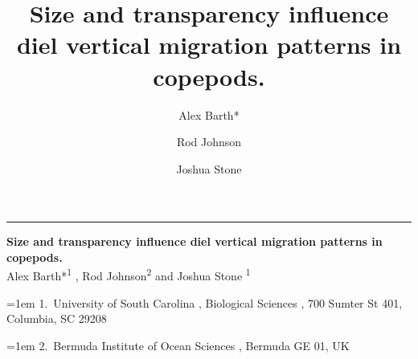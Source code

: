 \documentclass[
]{article}
\title{Size and transparency influence diel vertical migration patterns
in copepods.}
\author{Alex Barth* \and Rod Johnson \and Joshua Stone}
\date{}
\begin{document}
    \begin{titlepage}

\raggedleft %
\rule{1pt}{\textheight} %
\hspace{0.05\textwidth} %
\begin{minipage}[b][\textheight][s]{0.85\textwidth}

\raggedright
{\large\bfseries\nohyphens{Size and transparency influence diel vertical
migration patterns in copepods.}}\\[2\baselineskip] 

  
 {\large{Alex Barth*}}{\textsuperscript{1}}%
%
, 
 {\large{Rod Johnson}}{\textsuperscript{2}}%
%
%
{ and \large{Joshua Stone}}%
{\textsuperscript{1}}%
%



  
\vspace{2\baselineskip} 

\hangindent=1em
%
{1}.~{University of South Carolina}%
%
, %
{Biological Sciences}%
%
%
, %
{700 Sumter St 401, Columbia, SC 29208}%
%
\par\hangindent=1em%
%
{2}.~{Bermuda Institute of Ocean Sciences}%
%
%
, %
{Bermuda GE 01, UK}%
%

  
\vspace{1\baselineskip} 

              

\vfill


  
\vspace{0.1\textheight} 

\end{minipage}  \end{titlepage}
  \ifdefined\Shaded\renewenvironment{Shaded}{\begin{tcolorbox}[interior hidden, boxrule=0pt, sharp corners, enhanced, frame hidden, borderline west={3pt}{0pt}{shadecolor}, breakable]}{\end{tcolorbox}}\fi
\end{document}
